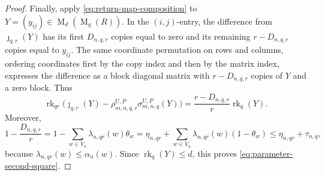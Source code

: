 \documentclass[10pt,a4paper]{amsart}
\DeclareMathOperator{\Mat}{M}
\DeclareMathOperator{\rk}{rk}
\begin{document}
\begin{proof}
Finally, apply \eqref{eq:return-map-composition} to
$Y=(y_{ij})\in\Mat_d(\Mat_q(R))$.
In the $(i,j)$-entry, the difference from $\jmath_{q,r}(Y)$ has its first $D_{n,q,r}$ copies equal to zero and
its remaining $r-D_{n,q,r}$ copies equal to $y_{ij}$.
The same coordinate permutation on rows and columns, ordering coordinates
first by the copy index and then by the matrix index, expresses the
difference as a block diagonal matrix with $r-D_{n,q,r}$ copies of $Y$ and a zero block.
Thus
\[
\rk_{qr}\bigl(
   \jmath_{q,r}(Y)-
   \rho_{m,n,q,r}^{U,P}\sigma_{m,n,q}^{U,P}(Y)
 \bigr)
 =\frac{r-D_{n,q,r}}r\rk_q(Y).
\]
Moreover,
\[
1-\frac{D_{n,q,r}}r
 =1-\sum_{w\in V_n}\lambda_{n,qr}(w)\theta_w
 =\eta_{n,qr}
   +\sum_{w\in V_n}\lambda_{n,qr}(w)(1-\theta_w)
 \leq\eta_{n,qr}+\tau_{n,q},
\]
because $\lambda_{n,qr}(w)\leq\alpha_n(w)$.
Since $\rk_q(Y)\leq d$, this proves
\eqref{eq:parameter-second-square}.
\end{proof}
\end{document}

